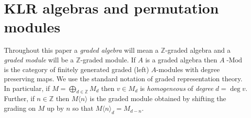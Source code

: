 \documentclass[twoside,11pt,reqno]{amsart}
\numberwithin{equation}{section}
\theoremstyle{definition}  %
\let\<\langle
\let\>\rangle
\newcommand\Comment[2][\relax]{\space\par\medskip\noindent%
   \fbox{\begin{minipage}{\textwidth}\textbf{Comment\ifx\relax#1\else---#1\fi}\newline%
        #2\end{minipage}}\medskip
}
\newcommand{\Z}{\mathbb{Z}}
\newcommand{\0}{{\bar 0}}
\newcommand{\1}{{\bar 1}}
\def\Mod#1{#1\!\operatorname{-Mod}}
\begin{document}
\section{KLR algebras and permutation modules}\label{SKLR}

Throughout this paper a \textit{graded
algebra}  will mean a $\Z$-graded algebra and a \textit{graded module} will be a $\Z$-graded module. If $A$ is a graded algebra then $\Mod{A}$ is
the category of finitely generated graded (left) $A$-modules with degree preserving maps.
We use the standard notation of graded representation theory. 
In particular, if $M=\bigoplus_{d\in\Z}M_d$ then $v\in M_d$ is
\textit{homogeneous} of \textit{degree} $d=\deg v$. Further, if $n\in\Z$ then $M\<n\>$ is the
graded module obtained by shifting the grading on $M$ up by $n$ so that $M\<n\>_d=M_{d-n}$.

\end{document}
